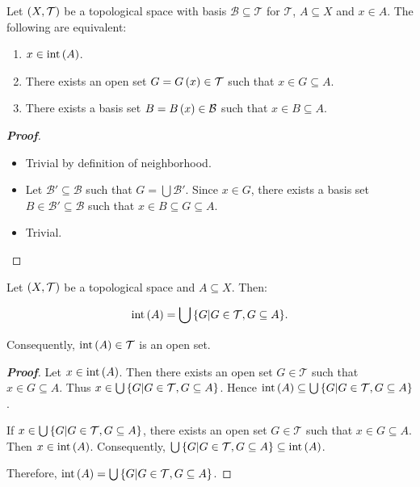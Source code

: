 \begin{proposition}
  Let $\left(X,\mathcal{T}\right)$ be a topological space with basis $\mathcal{B}\subseteq\mathcal{T}$ for $\mathcal{T}$, $A\subseteq X$ and $x\in A$. The following are equivalent:

  \begin{enumerate}
    \item $x\in\operatorname{int}\left(A\right)$.
    \item There exists an open set $G=G\left(x\right)\in\mathcal{T}$ such that $x\in G\subseteq A$.
    \item There exists a basis set $B=B\left(x\right)\in\mathcal{B}$ such that $x\in B\subseteq A$.
  \end{enumerate}
  \begin{proof}[\rm\textbf{Proof}]
    \hfill
    \begin{itemize}
      \item[\boxed{1\Rightarrow2}] Trivial by definition of neighborhood.
      \item[\boxed{2\Rightarrow3}] Let $\mathcal{B}'\subseteq\mathcal{B}$ such that $G=\bigcup{\mathcal{B}'}$. Since $x\in G$, there exists a basis set $B\in\mathcal{B}'\subseteq\mathcal{B}$ such that $x\in B\subseteq G\subseteq A$.
      \item[\boxed{3\Rightarrow1}] Trivial.
    \end{itemize}
  \end{proof}
\end{proposition}

\begin{proposition}
  Let $\left(X,\mathcal{T}\right)$ be a topological space and $A\subseteq X$. Then:
  
  \begin{equation}
    \operatorname{int}\left(A\right)=\bigcup{\left\{G\middle|G\in\mathcal{T},G\subseteq A\right\}}. 
  \end{equation}
  
  Consequently, $\operatorname{int}\left(A\right)\in\mathcal{T}$ is an open set.
  \begin{proof}[\rm\textbf{Proof}]
    Let $x\in\operatorname{int}\left(A\right)$. Then there exists an open set $G\in\mathcal{T}$ such that $x\in G\subseteq A$. Thus $x\in\bigcup{\left\{G\middle|G\in\mathcal{T},G\subseteq A\right\}}$. Hence $\operatorname{int}\left(A\right)\subseteq\bigcup{\left\{G\middle|G\in\mathcal{T},G\subseteq A\right\}}$. 
    
    If $x\in\bigcup{\left\{G\middle|G\in\mathcal{T},G\subseteq A\right\}}$, there exists an open set $G\in\mathcal{T}$ such that $x\in G\subseteq A$. Then $x\in\operatorname{int}\left(A\right)$. Consequently, $\bigcup{\left\{G\middle|G\in\mathcal{T},G\subseteq A\right\}}\subseteq\operatorname{int}\left(A\right)$. 
    
    Therefore, $\operatorname{int}\left(A\right)=\bigcup{\left\{G\middle|G\in\mathcal{T},G\subseteq A\right\}}$.
  \end{proof}
\end{proposition}

